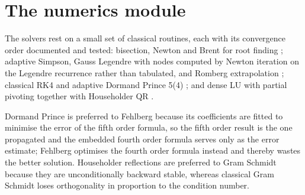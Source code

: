 \section{The numerics module}

The solvers rest on a small set of classical routines, each with its
convergence order documented and tested: bisection, Newton and Brent for root
finding \cite[Ch.~2]{burden2016}\cite[Ch.~4]{brent1973}; adaptive Simpson,
Gauss Legendre with nodes computed by Newton iteration on the Legendre
recurrence rather than tabulated, and Romberg extrapolation
\cite[Ch.~4]{burden2016}\cite{davis1984}; classical RK4 and adaptive Dormand
Prince 5(4) \cite{dormand1980}\cite[Sec.~II.4]{hairer1993}; and dense LU with
partial pivoting together with Householder QR
\cite[Sec.~3.2, 5.2]{golub2013}\cite[Lec.~10, 16]{trefethen1997}.

Dormand Prince is preferred to Fehlberg because its coefficients are fitted to
minimise the error of the fifth order formula, so the fifth order result is the
one propagated and the embedded fourth order formula serves only as the error
estimate; Fehlberg optimises the fourth order formula instead and thereby wastes
the better solution. Householder reflections are preferred to Gram Schmidt
because they are unconditionally backward stable, whereas classical Gram Schmidt
loses orthogonality in proportion to the condition number.

